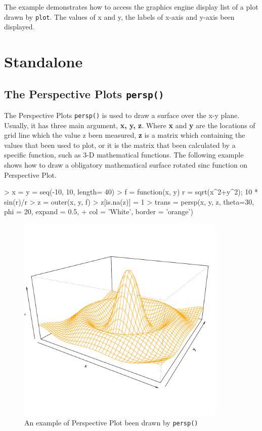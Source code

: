 \documentclass[paper=a4, fontsize=11pt]{report}
\begin{document}
The example demonstrates how to access the graphics engine display list of a plot drawn by \texttt{plot}. The values of x and y, the labels of x-axis and y-axis been displayed.



\chapter{Standalone}
\section{The Perspective Plots \texttt{persp()}}
The Perspective Plots \texttt{persp()} is used to draw a surface over the x-y plane. Usually, it has three main argument, \textbf{x, y, z}. Where \textbf{x} and \textbf{y} are the locations of grid line which the value z been measured, \textbf{z} is a matrix which containing the values that been used to plot, or it is the matrix that been calculated by a specific function, such as 3-D mathematical functions. The following example shows how to draw a obligatory mathematical surface rotated sinc function on Perspective Plot.
\begin{Schunk}
\begin{Sinput}
> x = y = seq(-10, 10, length= 40)
> f = function(x, y) { r = sqrt(x^2+y^2); 10 * sin(r)/r }
> z = outer(x, y, f)
> z[is.na(z)] = 1
> trans = persp(x, y, z, theta=30, phi = 20, expand = 0.5,
+               col = 'White', border = 'orange')
\end{Sinput}
\end{Schunk}
\begin{figure}[h]
\begin{center}
  \includegraphics[height = 10cm, width = 10cm]{figure/standalone_1.pdf}
  \caption{An example of Perspective Plot been drawn by \texttt{persp()}}
  	\label{figure4}
\end{center}
\end{figure}
\end{document}
